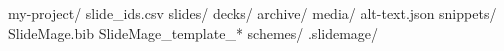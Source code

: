 my-project/
  slide_ids.csv           %
  slides/                 %
  decks/                  %
    archive/              %
  media/                  %
    alt-text.json         %
  snippets/               %
  SlideMage.bib           %
  SlideMage_template_*    %
  schemes/                %
  .slidemage/             %
